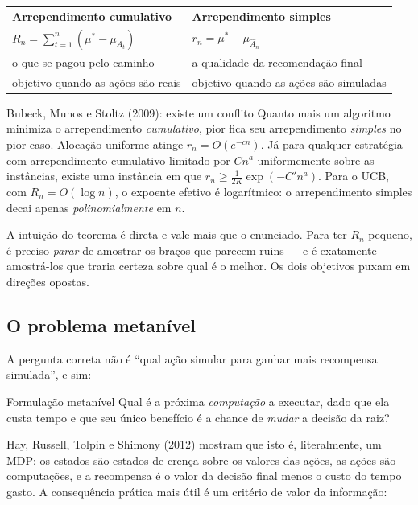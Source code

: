 \documentclass[11pt]{article}
\begin{document}
\begin{center}
\begin{tabular}{ll}
\toprule
\textbf{Arrependimento cumulativo} & \textbf{Arrependimento simples} \\
$R_n = \sum_{t=1}^{n}(\mu^{*} - \mu_{A_t})$ &
$r_n = \mu^{*} - \mu_{\widehat{A}_n}$ \\[0.3em]
o que se pagou pelo caminho & a qualidade da recomendação final \\
objetivo quando as ações são reais & objetivo quando as ações são simuladas \\
\bottomrule
\end{tabular}
\end{center}

\begin{teobox}{Bubeck, Munos e Stoltz (2009): existe um conflito}
Quanto mais um algoritmo minimiza o arrependimento \emph{cumulativo}, pior fica
seu arrependimento \emph{simples} no pior caso. Alocação uniforme atinge
$r_n = O(e^{-cn})$. Já para qualquer estratégia com arrependimento cumulativo
limitado por $C n^{a}$ uniformemente sobre as instâncias, existe uma instância em
que $r_n \ge \tfrac{1}{2K}\exp(-C' n^{a})$. Para o UCB, com $R_n = O(\log n)$, o
expoente efetivo é logarítmico: o arrependimento simples decai apenas
\emph{polinomialmente} em $n$.
\end{teobox}

A intuição do teorema é direta e vale mais que o enunciado. Para ter $R_n$
pequeno, é preciso \emph{parar} de amostrar os braços que parecem ruins — e é
exatamente amostrá-los que traria certeza sobre qual é o melhor. Os dois objetivos
puxam em direções opostas.

\subsection{O problema metanível}

A pergunta correta não é ``qual ação simular para ganhar mais recompensa
simulada'', e sim:

\begin{teobox}{Formulação metanível}
Qual é a próxima \emph{computação} a executar, dado que ela custa tempo e que seu
único benefício é a chance de \emph{mudar} a decisão da raiz?
\end{teobox}

Hay, Russell, Tolpin e Shimony (2012) mostram que isto é, literalmente, um MDP:
os estados são estados de crença sobre os valores das ações, as ações são
computações, e a recompensa é o valor da decisão final menos o custo do tempo
gasto. A consequência prática mais útil é um critério de valor da informação:
\end{document}
